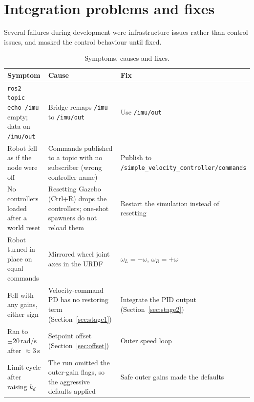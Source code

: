 \documentclass[11pt,a4paper]{article}
\newcommand{\rads}{\,\mathrm{rad/s}}
\begin{document}
\section{Integration problems and fixes}
Several failures during development were infrastructure issues rather than
control issues, and masked the control behaviour until fixed.

\begin{table}[ht]
\centering
\caption{Symptoms, causes and fixes.}
\small
\begin{tabular}{@{}p{4.1cm}p{5.2cm}p{4.2cm}@{}}
\toprule
Symptom & Cause & Fix \\
\midrule
\texttt{ros2 topic echo /imu} empty; data on \texttt{/imu/out} &
  Bridge remaps \texttt{/imu} to \texttt{/imu/out} & Use \texttt{/imu/out} \\
Robot fell as if the node were off &
  Commands published to a topic with no subscriber (wrong controller name) &
  Publish to \texttt{/simple\_\allowbreak velocity\_\allowbreak controller/\allowbreak commands} \\
No controllers loaded after a world reset &
  Resetting Gazebo (Ctrl+R) drops the controllers; one-shot spawners do not
  reload them & Restart the simulation instead of resetting \\
Robot turned in place on equal commands &
  Mirrored wheel joint axes in the URDF & $\omega_L=-\omega$, $\omega_R=+\omega$ \\
Fell with any gains, either sign &
  Velocity-command PD has no restoring term (Section~\ref{sec:stage1}) &
  Integrate the PID output (Section~\ref{sec:stage2}) \\
Ran to $\pm20\rads$ after $\approx3\,\mathrm{s}$ &
  Setpoint offset (Section~\ref{sec:offset}) & Outer speed loop \\
Limit cycle after raising $k_d$ &
  The run omitted the outer-gain flags, so the aggressive defaults applied &
  Safe outer gains made the defaults \\
\bottomrule
\end{tabular}
\end{table}

\end{document}
